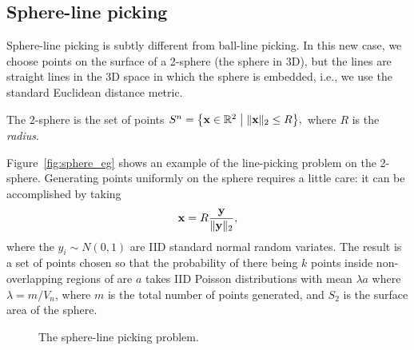 \subsection{Sphere-line picking}
\label{sec:sphere_line}

Sphere-line picking is subtly different from ball-line picking. In
this new case, we choose points on the surface of a 2-sphere (the
sphere in 3D), but the lines are straight lines in the 3D space in
which the sphere is embedded, i.e., we use the standard Euclidean
distance metric.

The $2$-sphere is the set of points $S^n = \big\{ {\mathbf x} \in \mathbb{R}^2
\; \big| \; \|{\mathbf x} \|_2 \leq R \big\},$ where $R$ is the {\em
  radius}.

Figure~\ref{fig:sphere_eg} shows an example of the line-picking
problem on the 2-sphere. Generating points uniformly on the sphere
requires a little care: it can be accomplished by taking 
\begin{equation}
    \label{eq:x_surface_sphere2}
    {\mathbf x} = R \frac{{\mathbf y}}{\| {\mathbf y} \|_2}, 
\end{equation}
where the $y_i \sim N(0,1)$ are IID standard normal random variates.
The result is a set of points chosen so that the probability of there
being $k$ points inside non-overlapping regions of are $a$ takes
IID Poisson distributions with mean $\lambda a$ where $\lambda =
m/V_n$, where $m$ is the total number of points generated, and $S_2$
is the surface area of the sphere.

\begin{figure}[tbp]
  \begin{center}
    \hspace{6mm}
    \caption{The sphere-line picking problem.}
  \end{center} 
\vspace{-4mm}
\end{figure}

